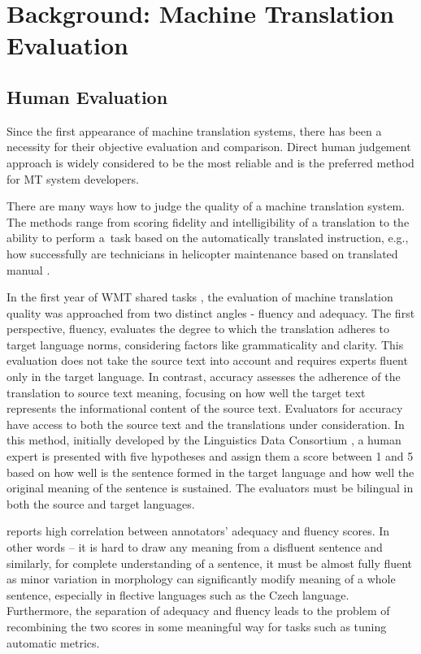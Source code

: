 \chapter{Background: Machine Translation Evaluation}

\section{Human Evaluation}
Since the first appearance of machine translation systems, there has been a necessity for their objective evaluation and comparison. Direct human judgement approach is widely considered to be the most reliable and is the preferred method for MT system developers. 

There are many ways how to judge the quality of a machine translation system. 
The methods range from scoring fidelity and intelligibility of a translation to the ability to perform a~task based on the automatically translated instruction, e.g., how successfully are technicians in  helicopter maintenance based on translated manual \cite{Sinaiko}.

In the first year of WMT shared tasks \citep{koehn-monz:2006:WMT}, the evaluation of machine translation quality was approached from two distinct angles - fluency and adequacy. The first perspective, fluency, evaluates the degree to which the translation adheres to target language norms, considering factors like grammaticality and clarity. This evaluation does not take the source text into account and requires experts fluent only in the target language. In contrast, accuracy assesses the adherence of the translation to source text meaning, focusing on how well the target text represents the informational content of the source text. Evaluators for accuracy have access to both the source text and the translations under consideration. 
In this method, initially  developed by the Linguistics Data Consortium , a human expert is presented with five hypotheses and assign them a score between 1 and 5 based on how well is the sentence formed in the target language and how well the original meaning of the sentence is sustained.
The evaluators must be bilingual in both the source and target languages. 

\cite{callison-burch-etal-2007-meta} reports high correlation between annotators’ adequacy and fluency scores. In other words -- it is hard to draw any meaning from a disfluent sentence and similarly, for complete understanding of a sentence, it must be almost fully fluent as minor variation in morphology can significantly modify meaning of a whole sentence, especially in flective languages such as the Czech language.  Furthermore, the separation of adequacy and fluency leads to the problem of recombining the two scores in some meaningful way for tasks such as tuning automatic metrics. 

